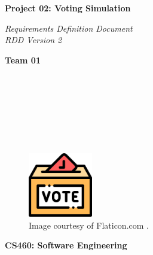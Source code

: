 \documentclass{article}
\begin{document}
\begin{titlepage}
\begin{center}
\vspace*{1cm}

\Huge
\textbf{Project 02: Voting Simulation}

\vspace{0.5cm}
\Large
\textit{Requirements Definition Document} \\
\textit{RDD Version 2}

\vspace{1cm}

\textbf{Team 01}

\vspace{0.5cm}

 \\
 \\
 \\
 \\
 \\
 \\

\vspace{1cm}

\begin{figure}[h]
    \centering
    \includegraphics[width=0.25\textwidth]{docs/rdd/figures/ballot_icon.png}
    \caption*{Image courtesy of Flaticon.com \cite{flaticonElectionsFree}.}
    \label{fig:safeIcon}
\end{figure}

\vspace{7cm}

\Large
\textbf{CS460: Software Engineering} \\

\end{center}
\end{titlepage}

\newpage

\tableofcontents

\newpage
\end{document}
